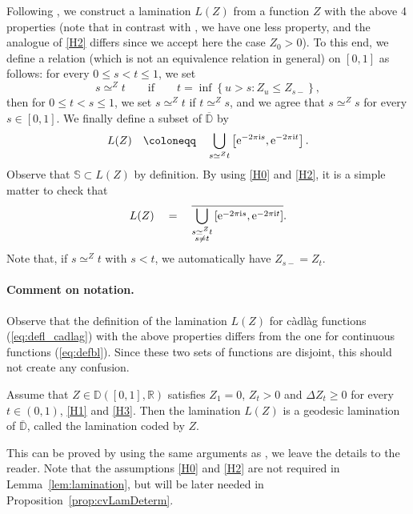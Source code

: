 \documentclass[AHL,XML,longabstracts,Unicode]{cedram}
\newcommand{\R}{\mathbb{R}}
\newcommand{\D}{\mathbb{D}}
\def\S{\mathbb{S}}
\def\e{{\rm e}}
\def\i{\mathrm{i}}
\begin{document}
Following \cite{Kor14},
we construct a lamination $L(Z)$ from a function $Z$ with the above 4 properties
(note that in contrast with \cite{Kor14}, we have one less property,
and the analogue of \ref{H2} differs since we accept here the case $Z_{0} > 0$).
To this end, we define a relation (which is not an equivalence relation in general) on $[0, 1]$ as follows:
for every $0 \le s < t \le 1$, we set
\[
s \simeq^Z t \qquad\text{if}\qquad t = \inf \left\{u > s : Z_{u} \le Z_{s-} \right\},
\]
then for $0 \le t < s \le 1$, we set $s \simeq^Z t$ if $t \simeq^Z s$, and we agree that $s \simeq^Z s$ for every $s \in [0,1]$. We finally define a subset of $\overline{\D}$ by
\begin{equation}
L(Z) \quad \coloneqq \quad \bigcup_{s \simeq^Z t} \left[\e^{-2\pi \i s}, \e^{-2\pi\i t}\right].
\label{eq:defl_cadlag}
\end{equation}
Observe that $\S \subset L(Z)$ by definition. By using \ref{H0} and \ref{H2}, it is a simple matter to check that
\begin{equation}\label{eq:lamination_stable2}
L(Z) \quad = \quad \overline{\bigcup_{\substack{s \simeq^Z t \\ s \neq t}} \left[\e^{-2\pi \i s}, \e^{-2\pi\i t}\right]}.
\end{equation}
Note that, if $s \simeq^Z t$ with $s<t$, we automatically have $Z_{s-}=Z_{t}$.

\paragraph*{Comment on notation.} Observe that the definition of the lamination $L(Z)$ for c\`adl\`ag functions  (\cref{eq:defl_cadlag}) with the above properties differs from the one
for continuous functions (\cref{eq:defbl}). Since these two sets of functions are disjoint, this should not create any confusion.


\begin{lemma}
\label{lem:lamination}Assume that  $Z \in {\D}([0, 1], \R)$ satisfies $Z_{1} = 0$, $Z_{t} > 0$ and $\Delta Z_{t} \ge 0$ for every $t \in (0,1)$, \ref{H1} and \ref{H3}. Then the lamination $L(Z)$ is a geodesic lamination of $\overline{\D}$, called the lamination coded by $Z$.
\end{lemma}
This can be proved by using the same arguments as \cite[Prop. 2.9]{Kor14}, we leave the details to the reader.
Note that the assumptions \ref{H0} and \ref{H2} are not required in Lemma~\ref{lem:lamination},
but will be later needed in Proposition~\ref{prop:cvLamDeterm}.
\end{document}
